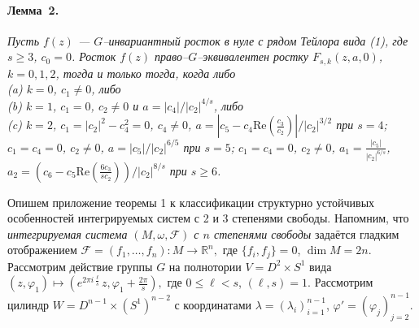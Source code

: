 \medskip
\paragraph{Лемма~2.}
{\it Пусть $f(z)$ --- $G$--инвариантный росток в нуле с рядом Тейлора вида {\rm(1)}, где
$s\ge3$, $c_0 = 0$.
Росток $f(z)$ право--$G$--эквивалентен ростку $F_{s,k}(z,a,0)$, $k=0,1,2$, тогда и только тогда, когда либо
\\
{\rm(a)} $k=0$,
$c_1 \neq 0$, либо
\\
{\rm(b)} $k=1$,
$c_1 = 0$, $c_2 \ne 0$ и $a=|c_4|/|c_2|^{4/s}$, либо
\\
{\rm(c)} $k=2$,
$c_1 = |c_2|^2-c_4^2 = 0$, $c_4\ne 0$, $a=|c_5-c_4\mathrm{Re}(\frac{c_3}{c_2 })|/|c_2|^{3/2}$ при $s=4$;
$c_1 = c_4 = 0$, $c_2 \neq 0$, $a=|c_5|/|c_2|^{6/5}$ при $s=5$;
$c_1 = c_4 = 0$, $c_2 \neq 0$, $a_1=\frac{|c_5|}{|c_2|^{6/s}}$, $a_2=(c_6-c_5\mathrm{Re}(\frac{6c_3}{sc_2}))/|c_2|^{8/s}$
при $s\ge6$.}

\medskip
Опишем приложение теоремы 1 к классификации структурно устойчивых особенностей интегрируемых систем с 2 и 3 степенями свободы.
Напомним, что {\em интегрируемая система $(M,\omega,\mathcal{F})$ с $n$ степенями свободы}
задаётся гладким отображением $\mathcal{F}=(f_1,\dots,f_n)
: M\to {\mathbb R}^n,$ где $\{f_i,f_j\}=0$, $\dim M=2n$.
%
Рассмотрим
действие группы $G
$ на полнотории $V=D^2\times S^1
$ вида
$
(z,\varphi_1)\mapsto (e^{2\pi i {\frac \ell s}}z,\varphi_1+\frac{2\pi}{s}),
$
где
$0\le\ell<s$, $(\ell,s)=1$. Рассмотрим цилиндр $W=D^{n-1}\times(S^1)^{n-2}$ с координатами $\lambda=(\lambda_i)_{i=1}^{n-1}$, $\varphi'=(\varphi_j)_{j=2}^{n-1}$.

